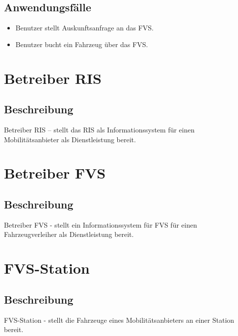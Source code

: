 \subsection{Anwendungsfälle}
\begin{itemize}
\item Benutzer stellt Auskunftsanfrage an das FVS.
\item Benutzer bucht ein Fahrzeug über das FVS.
\end{itemize}

\section{Betreiber RIS}

\subsection{Beschreibung}
Betreiber RIS – stellt das RIS als Informationssystem für einen Mobilitätsanbieter als Dienstleistung bereit.


\section{Betreiber FVS}
\subsection{Beschreibung}
Betreiber FVS - stellt ein Informationssystem für FVS für einen Fahrzeugverleiher als Dienstleistung bereit.


\section{FVS-Station}

\subsection{Beschreibung}
FVS-Station - stellt die Fahrzeuge eines Mobilitätsanbieters an einer Station bereit.

